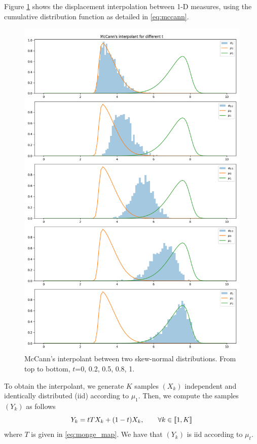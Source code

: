 Figure \ref{fig:mccann_1D_2skew} shows the displacement interpolation between 1-D measures, using the cumulative distribution function as detailed in \eqref{eq:mccann}.

\begin{figure}[H]
    \centering
    \includegraphics[width=\textwidth]{figures/mccann_1D_2skew.png}
    \caption{McCann's interpolant between two skew-normal distributions. From top to bottom, $t$=0, 0.2, 0.5, 0.8, 1.}
    \label{fig:mccann_1D_2skew}
\end{figure}

To obtain the interpolant, we generate $K$ samples $(X_k)$ independent and identically distributed (iid) according to $\mu_1$. Then, we compute the samples $(Y_k)$ as follows 
$$Y_k = tT X_k + (1-t)X_k, \qquad \forall k \in[\![ 1, K ]\!]$$ 
where $T$ is given in \eqref{eq:monge_map}. We have that $ (Y_k)$ is iid according to $\mu_t$.

